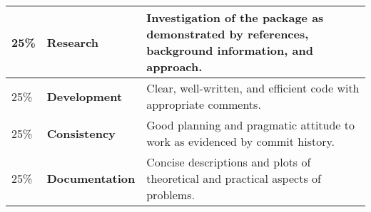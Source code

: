 \documentclass[12pt, a4paper, hidelinks]{scrartcl}
\begin{document}
  \begin{center}
    \begin{tabular}{llp{8.4cm}}
      \toprule
      25\% & \textbf{Research} & Investigation of the package as demonstrated by references, background information, and approach. \\
      \midrule
      25\% & \textbf{Development} & Clear, well-written, and efficient code with appropriate comments. \\
      \midrule
      25\% & \textbf{Consistency} & Good planning and pragmatic attitude to work as evidenced by commit history. \\
      \midrule
      25\% & \textbf{Documentation} & Concise descriptions and plots of theoretical and practical aspects of problems. \\
      \bottomrule
    \end{tabular}
  \end{center}
\end{document}
